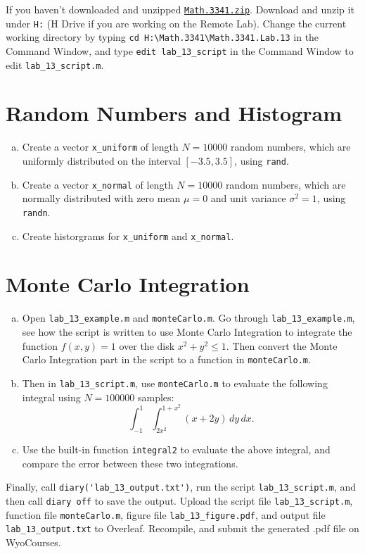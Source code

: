 If you haven't downloaded and unzipped \href{https://libaoj.in/courses/2021f/MATH3341/zip/Math.3341.zip}{\texttt{Math.3341.zip}}. Download and unzip it under \verb|H:| (H Drive if you are working on the Remote Lab). Change the current working directory by typing \verb|cd H:\Math.3341\Math.3341.Lab.13| in the Command Window, and type \verb|edit lab_13_script| in the Command Window to edit \verb|lab_13_script.m|.

\section{Random Numbers and Histogram}
\begin{enumerate}[(a)]
    \item Create a vector \verb`x_uniform` of length $N = 10000$ random numbers, which are uniformly distributed on the interval $[-3.5, 3.5]$, using \verb`rand`.
    \item Create a vector \verb`x_normal` of length $N = 10000$ random numbers, which are normally distributed with zero mean $\mu = 0$ and unit variance $\sigma^2 = 1$, using \verb`randn`.
    \item Create historgrams for \verb`x_uniform` and \verb`x_normal`.
\end{enumerate}
\section{Monte Carlo Integration}
\begin{enumerate}[(a)]
    \item Open \verb`lab_13_example.m` and \verb`monteCarlo.m`. Go through \verb`lab_13_example.m`, see how the script is written to use Monte Carlo Integration to integrate the function $f(x, y) = 1$ over the disk $x^2 + y^2 \leq 1$. Then convert the Monte Carlo Integration part in the script to a function in \verb|monteCarlo.m|.
    \item Then in \verb`lab_13_script.m`, use \verb`monteCarlo.m` to evaluate the following integral using $N = 100000$ samples:
        $$
        \int_{-1}^{1} \int_{2 x^2}^{1 + x^2} (x + 2y) \, dy \, dx.
        $$
    \item Use the built-in function \verb`integral2` to evaluate the above integral, and compare the error between these two integrations.
\end{enumerate}
Finally, call \verb|diary('lab_13_output.txt')|, run the script \verb|lab_13_script.m|, and then call \verb|diary off| to save the output. Upload the script file \verb|lab_13_script.m|, function file \verb|monteCarlo.m|, figure file \verb|lab_13_figure.pdf|, and output file \verb|lab_13_output.txt| to Overleaf. Recompile, and submit the generated .pdf file on WyoCourses.
